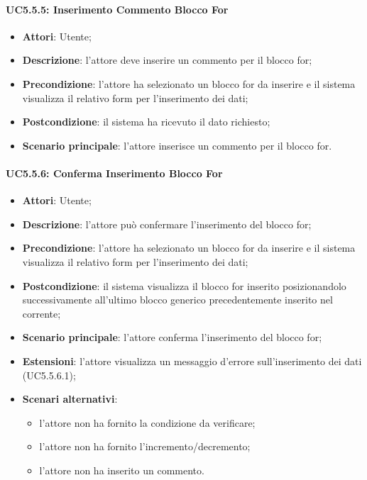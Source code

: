 \paragraph{UC5.5.5: Inserimento Commento Blocco For}
\label{UC5.5.5}
\begin{itemize}
	\item \textbf{Attori}: Utente;
	\item \textbf{Descrizione}: l'attore deve inserire un commento per il blocco for;
	\item \textbf{Precondizione}: l'attore ha selezionato un blocco for da inserire e il sistema visualizza il relativo form per l'inserimento dei dati;
	\item \textbf{Postcondizione}: il sistema ha ricevuto il dato richiesto;
	\item \textbf{Scenario principale}: l'attore inserisce un commento per il blocco for.
\end{itemize}

\paragraph{UC5.5.6: Conferma Inserimento Blocco For}
\label{UC5.5.6}
\begin{itemize}
	\item \textbf{Attori}: Utente;
	\item \textbf{Descrizione}: l'attore può confermare l'inserimento del blocco for;
	\item \textbf{Precondizione}: l'attore ha selezionato un blocco for da inserire e il sistema visualizza il relativo form per l'inserimento dei dati;
	\item \textbf{Postcondizione}: il sistema visualizza il blocco for inserito posizionandolo successivamente all'ultimo blocco generico precedentemente inserito nel  corrente;
	\item \textbf{Scenario principale}: l'attore conferma l'inserimento del blocco for;
	\item \textbf{Estensioni}: l'attore visualizza un messaggio d'errore sull'inserimento dei dati (UC5.5.6.1);
	\item \textbf{Scenari alternativi}:
	\begin{itemize}
		\item l'attore non ha fornito la condizione da verificare;
		\item l'attore non ha fornito l'incremento/decremento;
		\item l'attore non ha inserito un commento.
	\end{itemize}
\end{itemize}

